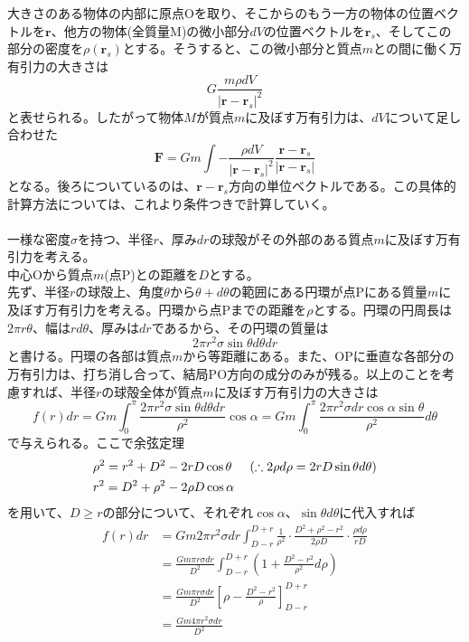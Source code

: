 \documentclass{jsarticle}
\begin{document}
大きさのある物体の内部に原点Oを取り、そこからのもう一方の物体の位置ベクトルを\(\bm{r}\)、他方の物体(全質量M)の微小部分\(dV\)の位置ベクトルを\(\bm{r}_{s}\)、そしてこの部分の密度を\(\rho(\bm{r}_{s})\)とする。そうすると、この微小部分と質点\(m\)との間に働く万有引力の大きさは
\[G\frac{m\rho dV}{|\bm{r}-\bm{r}_{s}|^2}\]
と表せられる。したがって物体\(M\)が質点\(m\)に及ぼす万有引力は、\(dV\)について足し合わせた
\[\bm{F}=Gm\int-\frac{\rho dV}{|\bm{r}-\bm{r}_{s}|^2}\frac{\bm{r}-\bm{r}_{s}}{|\bm{r}-\bm{r}_{s}|}\]
となる。後ろについているのは、\(\bm{r}-\bm{r}_{s}\)方向の単位ベクトルである。この具体的計算方法については、これより条件つきで計算していく。\\
\\
一様な密度\(\sigma\)を持つ、半径\(r\)、厚み\(dr\)の球殻がその外部のある質点\(m\)に及ぼす万有引力を考える。\\
中心Oから質点\(m\)(点P)との距離を\(D\)とする。\\
先ず、半径\(r\)の球殻上、角度\(\theta\)から\(\theta+d\theta\)の範囲にある円環が点Pにある質量\(m\)に及ぼす万有引力を考える。円環から点Pまでの距離を\(\rho\)とする。円環の円周長は\(2\pi r\theta\)、幅は\(rd\theta\)、厚みは\(dr\)であるから、その円環の質量は
\[2\pi r^2\sigma\sin\theta d\theta dr\]
と書ける。円環の各部は質点\(m\)から等距離にある。また、OPに垂直な各部分の万有引力は、打ち消し合って、結局PO方向の成分のみが残る。以上のことを考慮すれば、半径\(r\)の球殻全体が質点\(m\)に及ぼす万有引力の大きさは
\[f(r)dr=Gm\int_{0}^{\pi}\frac{2\pi r^2\sigma\sin\theta d\theta dr}{\rho^2}\cos\alpha=Gm\int_{0}^{\pi}\frac{2\pi r^2\sigma dr\cos\alpha\sin\theta}{\rho^2}d\theta\]
で与えられる。ここで余弦定理
\begin{align*}
&\rho^{2}=r^{2}+D^{2}-2rD\cos\theta\hspace{5mm}(\therefore 2\rho d\rho=2rD\sin\theta d\theta)\\
&r^{2}=D^{2}+\rho^{2}-2\rho D\cos\alpha
\end{align*}
を用いて、\(D\geq r\)の部分について、それぞれ\(\cos\alpha\)、\(\sin\theta d\theta\)に代入すれば
\begin{align*}
f(r)dr&=Gm2\pi r^{2}\sigma dr\int_{D-r}^{D+r}\frac{1}{\rho^2}\cdot\frac{D^2+\rho^{2}-r^2}{2\rho D}\cdot\frac{\rho d\rho}{rD}\\
&=\frac{Gm\pi r\sigma dr}{D^2}\int_{D-r}^{D+r}\left(1+\frac{D^2-r^2}{\rho^2}d\rho\right)\\
&=\frac{Gm\pi r\sigma dr}{D^2}\left[\rho-\frac{D^2-r^2}{\rho}\right]_{D-r}^{D+r}\\
&=\frac{Gm4\pi r^2\sigma dr}{D^2}
\end{align*}
\end{document}
